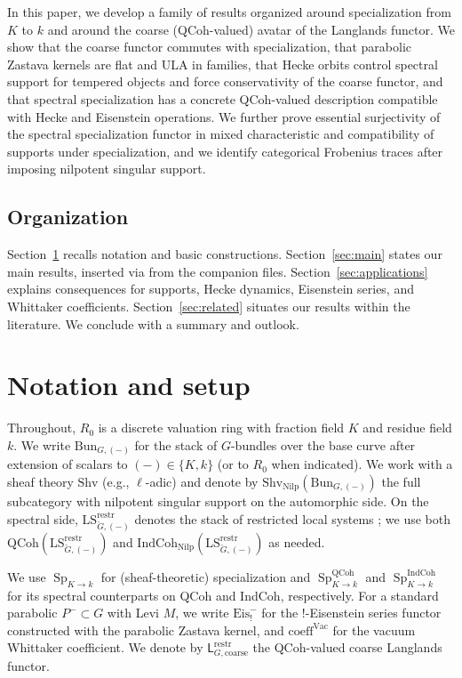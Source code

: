 \documentclass[11pt]{article}
\newcommand{\Sp}{\operatorname{Sp}}
\newcommand{\IndCoh}{\mathrm{IndCoh}}
\newcommand{\Nilp}{\mathrm{Nilp}}
\newcommand{\LS}{\mathrm{LS}}
\newcommand{\Shv}{\mathrm{Shv}}
\newcommand{\Bun}{\mathrm{Bun}}
\newcommand{\QCoh}{\mathrm{QCoh}}
\newcommand{\restr}{\mathrm{restr}}
\newcommand{\coarse}{\mathrm{coarse}}
\newcommand{\Vac}{\mathrm{Vac}}
\theoremstyle{plain}
\theoremstyle{definition}
\theoremstyle{remark}
\begin{document}
In this paper, we develop a family of results organized around specialization from $K$ to $k$ and around the coarse (QCoh-valued) avatar of the Langlands functor. We show that the coarse functor commutes with specialization, that parabolic Zastava kernels are flat and ULA in families, that Hecke orbits control spectral support for tempered objects and force conservativity of the coarse functor, and that spectral specialization has a concrete QCoh-valued description compatible with Hecke and Eisenstein operations. We further prove essential surjectivity of the spectral specialization functor in mixed characteristic and compatibility of supports under specialization, and we identify categorical Frobenius traces after imposing nilpotent singular support.

\subsection*{Organization}
Section\ \ref{sec:setup} recalls notation and basic constructions. Section\ \ref{sec:main} states our main results, inserted via \verb++ from the companion files. Section\ \ref{sec:applications} explains consequences for supports, Hecke dynamics, Eisenstein series, and Whittaker coefficients. Section\ \ref{sec:related} situates our results within the literature. We conclude with a summary and outlook.

\section{Notation and setup}\label{sec:setup}
Throughout, $R_0$ is a discrete valuation ring with fraction field $K$ and residue field $k$. We write $\Bun_{G,(-)}$ for the stack of $G$-bundles over the base curve after extension of scalars to $(-)\in\{K,k\}$ (or to $R_0$ when indicated). We work with a sheaf theory $\Shv$ (e.g., $\ell$-adic) and denote by $\Shv_{\Nilp}(\Bun_{G,(-)})$ the full subcategory with nilpotent singular support on the automorphic side. On the spectral side, $\LS^{\restr}_{\check G,(-)}$ denotes the stack of restricted local systems \cite{AGKRRV2020-RestrictedLocSys}; we use both $\QCoh(\LS^{\restr}_{\check G,(-)})$ and $\IndCoh_{\Nilp}(\LS^{\restr}_{\check G,(-)})$ as needed.

We use $\Sp_{K\to k}$ for (sheaf-theoretic) specialization and $\Sp^{\QCoh}_{K\to k}$ and $\Sp^{\IndCoh}_{K\to k}$ for its spectral counterparts on QCoh and IndCoh, respectively. For a standard parabolic $P^-\subset G$ with Levi $M$, we write $\mathrm{Eis}^-_{!}$ for the !-Eisenstein series functor constructed with the parabolic Zastava kernel, and $\mathrm{coeff}^{\Vac}$ for the vacuum Whittaker coefficient. We denote by $\mathsf L^{\restr}_{G,\coarse}$ the QCoh-valued coarse Langlands functor.
\end{document}
